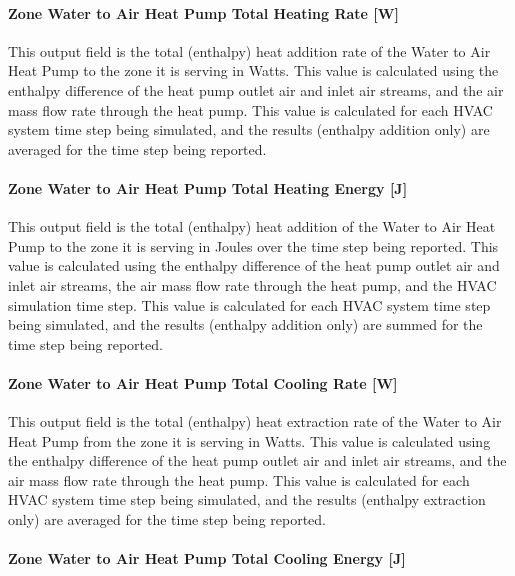\paragraph{Zone Water to Air Heat Pump Total Heating Rate {[}W{]}}\label{zone-water-to-air-heat-pump-total-heating-rate-w}

This output field is the total (enthalpy) heat addition rate of the Water to Air Heat Pump to the zone it is serving in Watts. This value is calculated using the enthalpy difference of the heat pump outlet air and inlet air streams, and the air mass flow rate through the heat pump. This value is calculated for each HVAC system time step being simulated, and the results (enthalpy addition only) are averaged for the time step being reported.

\paragraph{Zone Water to Air Heat Pump Total Heating Energy {[}J{]}}\label{zone-water-to-air-heat-pump-total-heating-energy-j}

This output field is the total (enthalpy) heat addition of the Water to Air Heat Pump to the zone it is serving in Joules over the time step being reported. This value is calculated using the enthalpy difference of the heat pump outlet air and inlet air streams, the air mass flow rate through the heat pump, and the HVAC simulation time step. This value is calculated for each HVAC system time step being simulated, and the results (enthalpy addition only) are summed for the time step being reported.

\paragraph{Zone Water to Air Heat Pump Total Cooling Rate {[}W{]}}\label{zone-water-to-air-heat-pump-total-cooling-rate-w}

This output field is the total (enthalpy) heat extraction rate of the Water to Air Heat Pump from the zone it is serving in Watts. This value is calculated using the enthalpy difference of the heat pump outlet air and inlet air streams, and the air mass flow rate through the heat pump. This value is calculated for each HVAC system time step being simulated, and the results (enthalpy extraction only) are averaged for the time step being reported.

\paragraph{Zone Water to Air Heat Pump Total Cooling Energy {[}J{]}}\label{zone-water-to-air-heat-pump-total-cooling-energy-j}

